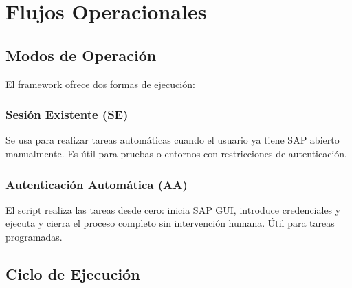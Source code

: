 \documentclass[11pt,a4paper]{article}
\begin{document}
\section{Flujos Operacionales}

\subsection{Modos de Operación}

El framework ofrece dos formas de ejecución:

\subsubsection{Sesión Existente (SE)}
Se usa para realizar tareas automáticas cuando el usuario ya tiene SAP abierto manualmente.  Es útil para pruebas o entornos con restricciones de autenticación.

\subsubsection{Autenticación Automática (AA)}
El script realiza las tareas desde cero: inicia SAP GUI, introduce credenciales y ejecuta y cierra el proceso completo sin intervención humana.  Útil para tareas programadas. 

\subsection{Ciclo de Ejecución}
\end{document}
